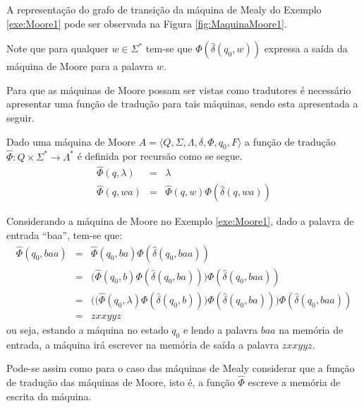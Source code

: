 \begin{example}\label{exe:MaquinaMooreGrafo1}
	A representação do grafo de transição da máquina de Mealy do Exemplo \ref{exe:Moore1} pode ser observada na Figura \ref{fig:MaquinaMoore1}.
\end{example}

\begin{remark}
	Note que para qualquer $w \in \Sigma^*$ tem-se que $\Phi(\widehat{\delta}(q_0,w))$ expressa a saída da máquina de Moore para a palavra $w$.
\end{remark}

Para que as máquinas de Moore possam ser vistas como tradutores é necessário apresentar uma função de tradução para tais máquinas, sendo esta apresentada a seguir.

\begin{definition}
	Dado uma máquina de Moore $A = \langle Q, \Sigma, \Lambda, \delta, \Phi, q_0, F\rangle$ a função de tradução $\widehat{\Phi} : Q \times \Sigma^* \rightarrow \Lambda^*$ é definida por recursão como se segue.
	\begin{eqnarray}\label{eq:ExtensaoDaFuncaoDetraducaoMoore}
		\widehat{\Phi}(q, \lambda)& = & \lambda \\
		\widehat{\Phi}(q, wa)& = & \widehat{\Phi}(q, w)\Phi(\widehat{\delta}(q, wa))
	\end{eqnarray}
\end{definition}

\begin{example}
	Considerando a máquina de Moore no Exemplo \ref{exe:Moore1}, dado a palavra de entrada ``baa'', tem-se que:
	\begin{eqnarray*}
		\widehat{\Phi}(q_0, baa) & = & \widehat{\Phi}(q_0, ba)\Phi(\widehat{\delta}(q_0, baa))\\
		& = & \Big(\widehat{\Phi}(q_0, b)\Phi(\widehat{\delta}(q_0, ba)) \Big)\Phi(\widehat{\delta}(q_0, baa))\\
		& = & \Big(\Big(\widehat{\Phi}(q_0, \lambda)\Phi(\widehat{\delta}(q_0, b))\Big)\Phi(\widehat{\delta}(q_0, ba)) \Big)\Phi(\widehat{\delta}(q_0, baa))\\
		& = & zxxyyz
	\end{eqnarray*}
	ou seja, estando a máquina no estado $q_0$ e lendo a palavra $baa$ na memória de entrada, a máquina irá escrever na memória de saída a palavra $zxxyyz$.
\end{example}

\begin{remark}
	Pode-se assim como para o caso das máquinas de Mealy considerar que a função de tradução das máquinas de Moore, isto é, a função $\widehat{\Phi}$ escreve a memória de escrita da máquina.
\end{remark}

